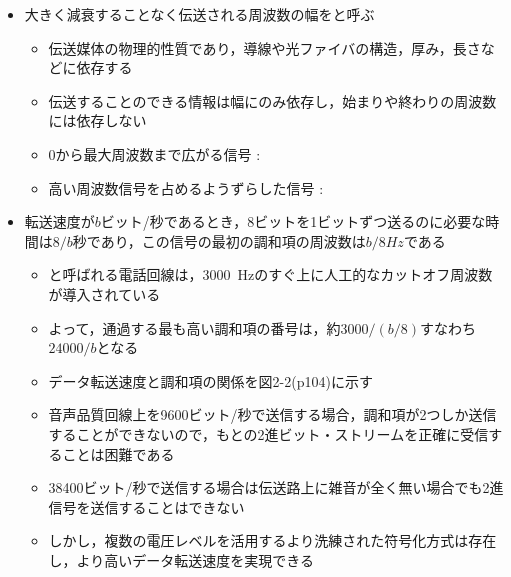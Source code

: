 \documentclass[a4paper]{ltjsarticle}
\begin{document}
\begin{itemize}
				\item 大きく減衰することなく伝送される周波数の幅をと呼ぶ
				\begin{itemize}
					\item 伝送媒体の物理的性質であり，導線や光ファイバの構造，厚み，長さなどに依存する
					\item 伝送することのできる情報は幅にのみ依存し，始まりや終わりの周波数には依存しない
					\item 0から最大周波数まで広がる信号 : 
					\item 高い周波数信号を占めるようずらした信号 : 
				\end{itemize}
				\item 転送速度が$b$ビット/秒であるとき，8ビットを1ビットずつ送るのに必要な時間は$8/b$秒であり，この信号の最初の調和項の周波数は$b/8 \si{Hz}$である
				\begin{itemize}
					\item {}と呼ばれる電話回線は，\SI{3000}{Hz}のすぐ上に人工的なカットオフ周波数が導入されている
					\item よって，通過する最も高い調和項の番号は，約$3000/(b/8)$すなわち$24000/b$となる
					\item データ転送速度と調和項の関係を図2-2(p104)に示す
					\item 音声品質回線上を9600ビット/秒で送信する場合，調和項が2つしか送信することができないので，もとの2進ビット・ストリームを正確に受信することは困難である
					\item 38400ビット/秒で送信する場合は伝送路上に雑音が全く無い場合でも2進信号を送信することはできない
					\item しかし，複数の電圧レベルを活用するより洗練された符号化方式は存在し，より高いデータ転送速度を実現できる
				\end{itemize}
      \end{itemize}
\end{document}
